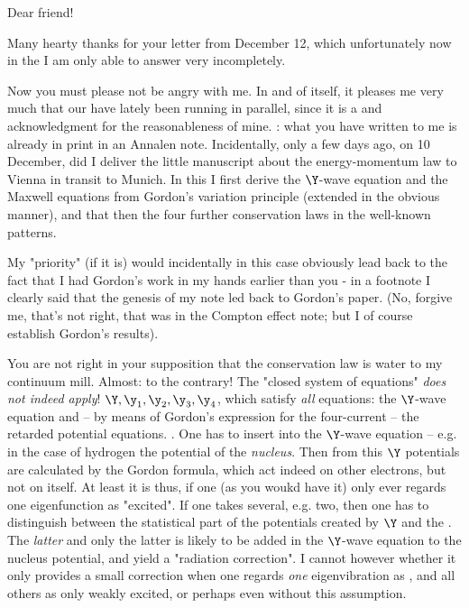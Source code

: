 \date{December 15, 1926}

Dear friend!

Many hearty thanks for your  letter from December 12, which unfortunately now in the  I am only able to answer very incompletely.

Now you must please not be angry with me. In and of itself, it pleases me very much that our  have lately been running in parallel, since it is a  and acknowledgment for the reasonableness of mine. : what you have written to me is already in print in an Annalen note. Incidentally, only a few days ago, on 10 December, did I deliver the little manuscript about the energy-momentum law to Vienna in transit to Munich. In this I first derive the $\Y$-wave equation and the Maxwell equations from Gordon's variation principle (extended in the obvious manner), and that then  the four further conservation laws in the well-known patterns.

My  "priority" (if it is) would incidentally in this case obviously lead back to the fact that I had Gordon's work in my hands earlier than you - in a footnote I clearly said that the genesis of my note led back to Gordon's paper. (No, forgive me, that's not right, that was in the Compton effect note; but I of course  establish Gordon's results).

You are not right in your supposition that the conservation law is water to my continuum mill. Almost: to the contrary! The "closed system of equations" \textit{does not indeed apply}!  $\Y,\y_1,\y_2,\y_3,\y_4$, which satisfy \textit{all} equations: the $\Y$-wave equation and -- by means of Gordon's expression for the four-current -- the retarded potential equations. \textit{}. One has to insert into the $\Y$-wave equation -- e.g. in the case of hydrogen the potential of the \textit{nucleus}. Then from this $\Y$ potentials are calculated by the Gordon formula, which act indeed on other electrons, but not on itself. At least it is thus, if one (as you woukd have it) only ever regards one eigenfunction as "excited". If one takes several, e.g. two, then one has to distinguish between the statistical part of the potentials created by $\Y$ and the . The \textit{latter} and only the latter is likely to be added in the $\Y$-wave equation to the nucleus potential, and yield a "radiation correction". I cannot however  whether it only provides a small correction when one regards \textit{one} eigenvibration as , and all others as only weakly excited, or perhaps even without this assumption.

